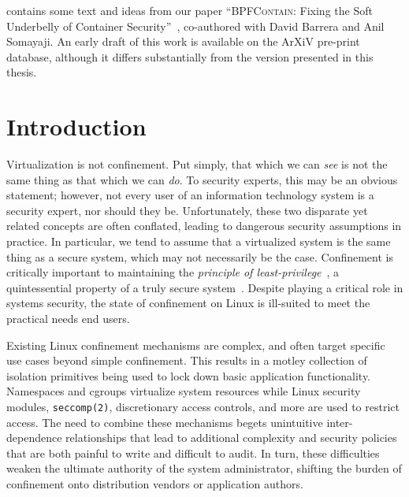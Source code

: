\documentclass[
  fontsize=12pt,
  titlepage=firstiscover,
  paper=letter,
oneside,
  cleardoublepage=plain,
  parskip=half-,
  DIV=10,
  parindent,
  appendixprefix,
  chapterprefix,
  listof=totoc,
]{scrbook}
\newcommand{\bpfcontain}{\textsc{BPFContain}}
\begin{document}
 contains some text and ideas from our paper \enquote{\bpfcontain{}:
Fixing the Soft Underbelly of Container Security}~\cite{findlay2021_bpfcontain},
co-authored with David Barrera and Anil Somayaji. An early draft of this work is available
on the ArXiV pre-print database, although it differs substantially from the version
presented in this thesis.
\endgroup
\cleardoublepage

\begingroup
\hypersetup{linkcolor=black}
\tableofcontents
\begin{singlespace}
\listoffigures
\listoftables
\lstlistoflistings
\end{singlespace}
\endgroup

\mainmatter



\chapter{Introduction}\label{c:introduction}












Virtualization is not confinement. Put simply, that which we can \textit{see} is not the
same thing as that which we can \textit{do}. To security experts, this may be an obvious
statement; however, not every user of an information technology system is a security
expert, nor should they be. Unfortunately, these two disparate yet related concepts are
often conflated, leading to dangerous security assumptions in practice. In particular, we
tend to assume that a virtualized system is the same thing as a secure system, which may
not necessarily be the case. Confinement is critically important to maintaining the
\textit{principle of least-privilege}~\cite{schneider03_least_privilege}, a quintessential
property of a truly secure system~\cite{van_oorschot2020_tools_jewels}. Despite playing
a critical role in systems security, the state of confinement on Linux is ill-suited to
meet the practical needs end users.

Existing Linux confinement mechanisms are complex, and often target specific use cases
beyond simple confinement. This results in a motley collection of isolation primitives
being used to lock down basic application functionality. Namespaces and cgroups virtualize
system resources while Linux security modules, \texttt{seccomp(2)}, discretionary access
controls, and more are used to restrict access. The need to combine these mechanisms
begets unintuitive inter-dependence relationships that lead to additional complexity and
security policies that are both painful to write and difficult to audit. In turn, these
difficulties weaken the ultimate authority of the system administrator, shifting the
burden of confinement onto distribution vendors or application authors.
\end{document}
